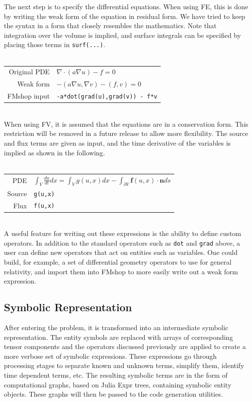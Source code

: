 \documentclass[twoside,leqno,twocolumn]{article}
\begin{document}
The next step is to specify the differential equations. When using FE, this is done by writing the weak form of the equation in residual form. We have tried to keep the syntax in a form that closely resembles the mathematics. Note that integration over the volume is implied, and surface integrals can be specified by placing those terms in \texttt{surf(...)}.\\
\\
\begin{tabular}{r|l}
Original PDE & $\nabla \cdot (a \nabla u) - f = 0$\\
Weak form & $-(a\nabla u , \nabla v) - (f,v) = 0$\\
FMshop input & \texttt{-a*dot(grad(u),grad(v)) - f*v}
\end{tabular}
\\

When using FV, it is assumed that the equations are in a conservation form. This restriction will be removed in a future release to allow more flexibility. The source and flux terms are given as input, and the time derivative of the variables is implied as shown in the following.\\
\\
\begin{tabular}{r|l}
PDE & $\int_V \frac{du}{dt}dx = \int_V g(u,x)dx - \int_{\partial V} \textbf{f}(u,x)\cdot \textbf{n}ds$\\
Source& \texttt{g(u,x)}\\
Flux & \texttt{f(u,x)}
\end{tabular}
\\

A useful feature for writing out these expressions is the ability to define custom operators. In addition to the standard operators such as \texttt{dot} and \texttt{grad} above, a user can define new operators that act on entities such as variables. One could build, for example, a set of differential geometry operators to use for general relativity, and import them into FMshop to more easily write out a weak form expression.

\subsection{Symbolic Representation}
After entering the problem, it is transformed into an intermediate symbolic representation. The entity symbols are replaced with arrays of corresponding tensor components and the operators discussed previously are applied to create a more verbose set of symbolic expressions. These expressions go through processing stages to separate known and unknown terms, simplify them, identify time dependent terms, etc. The resulting symbolic terms are in the form of computational graphs, based on Julia Expr trees, containing symbolic entity objects. These graphs will then be passed to the code generation utilities.
\end{document}
